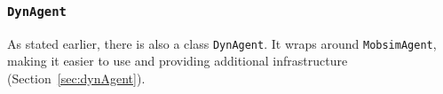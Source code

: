 \subsubsection{\lstinline{DynAgent}}
As stated earlier, there is also a class \lstinline$DynAgent$. It wraps around  \lstinline$MobsimAgent$, making it easier to use and providing additional infrastructure (Section~\ref{sec:dynAgent}).


